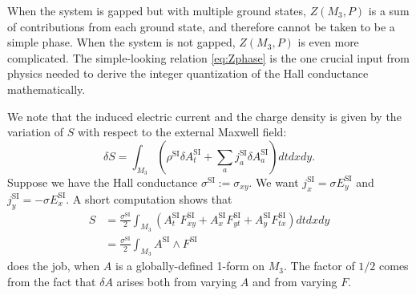 \documentclass[12pt]{article}
\numberwithin{equation}{section}
\numberwithin{figure}{section}
\theoremstyle{remark}
\begin{document}
When the system is gapped but with multiple ground states,
$Z(M_3,P)$ is a sum of contributions from each ground state,
and therefore cannot be taken to be a simple phase.
When the system is not gapped, $Z(M_3,P)$ is even more complicated.
The simple-looking relation \eqref{eq:Zphase} 
is the one crucial input from physics
needed to derive the integer quantization of the Hall conductance
mathematically.

We note that the induced electric current and the charge density
is given by the variation of $S$ with respect to the external Maxwell field:
\begin{equation}
  \delta S=\int_{M_3} (\rho^\text{SI} \delta A^\text{SI}_t 
  + \sum_a j^\text{SI}_a \delta A^\text{SI}_a) dt dx dy.
\end{equation}
Suppose we have the Hall conductance $\sigma^\text{SI}:=\sigma_{xy}$.
We want $j^\text{SI}_x=\sigma E_y^\text{SI}$ and $j^\text{SI}_y=-\sigma E_x^\text{SI}$.
A short computation shows that \begin{align}
S&=\frac{\sigma^\text{SI}}2 \int_{M_3} 
(A^\text{SI}_t F_{xy}^\text{SI} + A^\text{SI}_x F_{yt}^\text{SI} + A^\text{SI}_y F_{tx}^\text{SI}) dt dx dy \\
&= \frac{\sigma^\text{SI}}2 \int_{M_3} A^\text{SI}\wedge F^\text{SI}
\label{eq:halldef}
\end{align} does the job,
when $A$ is a globally-defined 1-form on $M_3$.
The factor of $1/2$ comes from the fact that $\delta A$ arises
both from varying $A$ and from varying $F$.
\end{document}
